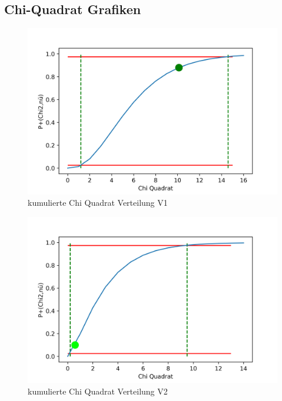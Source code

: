 \subsection{Chi-Quadrat Grafiken}
\begin{figure}[!ht]
	\centering								 
	\includegraphics[width=350pt]{fotos/gpr1/kumulierte Chi Quadrat Verteilung V1.png}			 
	\caption{kumulierte Chi Quadrat Verteilung V1}							 
	\label{kumulierte Chi Quadrat Verteilung V1}							 
\end{figure}
\newpage
\begin{figure}[!ht]
	\centering								 
	\includegraphics[width=350pt]{fotos/gpr1/kumulierte Chi Quadrat Verteilung V2.png}			 
	\caption{kumulierte Chi Quadrat Verteilung V2}							 
	\label{kumulierte Chi Quadrat Verteilung V2}							 
\end{figure}

